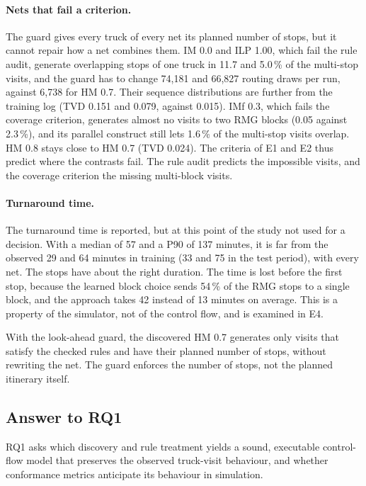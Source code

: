 \paragraph{Nets that fail a criterion.} The guard gives every truck of every net its
planned number of stops, but it cannot repair how a net combines them. IM 0.0 and
ILP 1.00, which fail the rule audit, generate overlapping stops of one truck in
11.7 and 5.0\,\% of the multi-stop visits, and the guard has to change 74,181 and
66,827 routing draws per run, against 6,738 for HM 0.7. Their sequence
distributions are further from the training log (TVD 0.151 and 0.079, against
0.015). IMf 0.3, which fails the coverage criterion, generates almost no visits to
two RMG blocks (0.05 against 2.3\,\%), and its parallel construct still lets
1.6\,\% of the multi-stop visits overlap. HM 0.8 stays close to HM 0.7 (TVD 0.024).
The criteria of E1 and E2 thus predict where the contrasts fail. The rule audit
predicts the impossible visits, and the coverage criterion the missing multi-block
visits.

\paragraph{Turnaround time.} The turnaround time is reported, but at this point of
the study not used for a decision. With a median of 57 and a P90 of 137 minutes, it
is far from the observed 29 and 64 minutes in training (33 and 75 in the test
period), with every net. The stops have about the right duration. The time is lost
before the first stop, because the learned block choice sends 54\,\% of the RMG
stops to a single block, and the approach takes 42 instead of 13 minutes on average.
This is a property of the simulator, not of the control flow, and is examined in
E4.

With the look-ahead guard, the discovered HM 0.7 generates only visits that satisfy
the checked rules and have their planned number of stops, without rewriting the
net. The guard enforces the number of stops, not the planned itinerary itself.

\subsection{Answer to RQ1}
\label{sec:res_rq1}

RQ1 asks which discovery and rule treatment yields a sound, executable
control-flow model that preserves the observed truck-visit behaviour, and whether
conformance metrics anticipate its behaviour in simulation.

